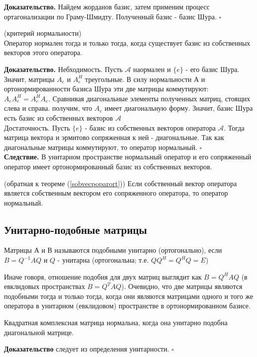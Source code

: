 \textbf{Доказательство.} Найдем жорданов базис, затем применим процесс
ортагонализации по Граму-Шмидту. Полученный базис - базис Шура. $\square$
\begin{theor}(критерий нормальности)\\
Оператор нормален тогда и только тогда, когда существует базис из собственных
векторов этого оператора.
\end{theor}
\textbf{Доказательство.} Небходимость. Пусть $\mathcal A$ наормален и $\{e\}$ 
- его базис Шура. Значит, матрицы $A_e$ и $A_e^H$ треугольные. В силу 
нормальности А и ортонормированности базиса Шура эти две матрицы
коммутируют: $A_eA_e^H=A_e^HA_e$. Сравнивая диагональные элементы полученных
матриц, стоящих слева и справа. получим, что $A_e$ имеет диагональную форму.
Значит, базис Шура есть базис из собственных векторов $\mathcal A$\\
Достаточность. Пусть $\{e\}$ - базис из собственных векторов оператора 
$\mathcal A$. Тогда матрица вектора и эрмитово сопряженная к ней - 
диагональные. Так как диагональные матрицы коммутируют, то оператор нормальный.
$\square$\\
\textbf{Следствие.} В унитарном пространстве нормальный оператор и его
сопряженный оператор имеет ортонормированный базис из собственных векторов. 
\begin{theor}(обратная к теореме (\ref{sobvecpoparort}))
Если собственный вектор оператора является собственным вектором его 
сопряженного оператора, то оператор нормальный.
\end{theor}

\subsection{Унитарно-подобные матрицы}
\begin{defin}
Матрицы А и В называются подобными унитарно (ортогонально), если
$B=Q^{-1}AQ$ и $Q$ - унитарна (ортогональна; т.е. $QQ^H=Q^HQ=E$)
\end{defin}
Иначе говоря, отношение подобия для двух матриц выглядит как $B=Q^HAQ$
(в евклидовых пространствах $B=Q^TAQ$). Очевидно, что две матрицы являются
подобными тогда и
только тогда, когда они являются матрицами одного и того же оператора в
унитарном (евклидовом) пространстве в ортонормированном базисе.
\begin{theor}
Квадратная комплексная матрица нормальна, когда она унитарно подобна 
диагональной матрице.
\end{theor}
\textbf{Доказательство} следует из определения унитарности. $\square$
